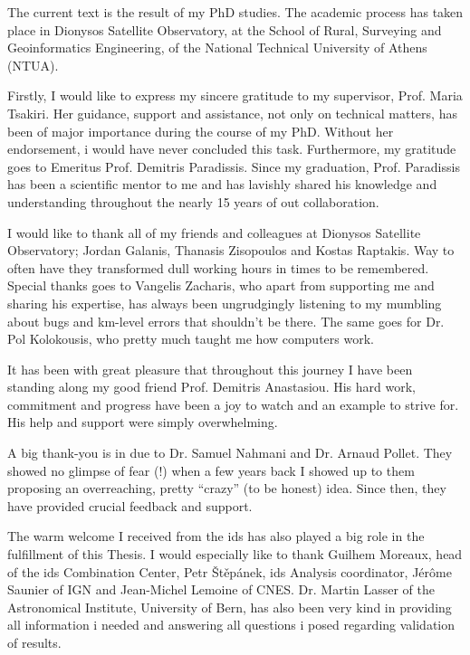 The current text is the result of my PhD studies. The academic process has
taken place in Dionysos Satellite Observatory, at the School of Rural, Surveying 
and Geoinformatics Engineering, of the National Technical University of Athens 
(NTUA).

Firstly, I would like to express my sincere gratitude to my supervisor, Prof. Maria 
Tsakiri. Her guidance, support and assistance, not only on technical matters, has 
been of major importance during the course of my PhD. Without her endorsement, i 
would have never concluded this task. Furthermore, my gratitude goes to Emeritus Prof. 
Demitris Paradissis. Since my graduation, Prof. Paradissis has been a scientific 
mentor to me and has lavishly shared his knowledge and understanding throughout 
the nearly 15 years of out collaboration. 

I would like to thank all of my friends and colleagues at Dionysos Satellite 
Observatory; Jordan Galanis, Thanasis Zisopoulos and Kostas Raptakis. Way to 
often have they transformed dull working hours in times to be remembered. Special 
thanks goes to Vangelis Zacharis, who apart from supporting me and sharing his 
expertise, has always been ungrudgingly listening to my mumbling about bugs and 
km-level errors that shouldn't be there. The same goes for Dr. Pol Kolokousis, who 
pretty much taught me how computers work.

It has been with great pleasure that throughout this journey I have been standing 
along my good friend Prof. Demitris Anastasiou. His hard work, commitment and 
progress have been a joy to watch and an example to strive for. His help and 
support were simply overwhelming.

A big thank-you is in due to Dr. Samuel Nahmani and Dr. Arnaud Pollet. They showed no 
glimpse of fear (!) when a few years back I showed up to them proposing an overreaching,
pretty ``crazy'' (to be honest) idea. Since then, they have provided crucial 
feedback and support.

The warm welcome I received from the \gls{ids} has also played a big role in the 
fulfillment of this Thesis. I would especially like to thank Guilhem Moreaux, 
head of the \gls{ids} Combination Center, Petr Štěpánek, \gls{ids} Analysis 
coordinator, Jérôme Saunier of IGN and Jean-Michel Lemoine of CNES. 
Dr. Martin Lasser of the Astronomical 
Institute, University of Bern, has also been very kind in providing all information 
i needed and answering all questions i posed regarding validation of results.

